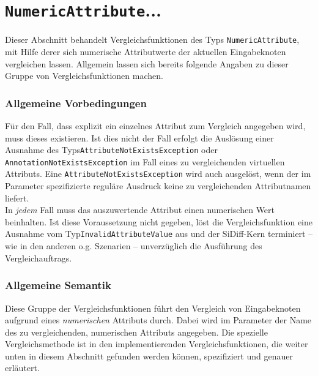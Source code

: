 %
%

\section{\texttt{NumericAttribute}...}
\label{strct:spec:numattr}
Dieser Abschnitt behandelt Vergleichsfunktionen des Typs \texttt{NumericAttribute}, mit Hilfe derer sich numerische Attributwerte der aktuellen Eingabeknoten vergleichen lassen. Allgemein lassen sich bereits folgende Angaben zu dieser Gruppe von Vergleichsfunktionen machen.

\subsubsection*{Allgemeine Vorbedingungen}
Für den Fall, dass explizit ein einzelnes Attribut zum Vergleich angegeben wird, muss dieses existieren. Ist dies nicht der Fall erfolgt die Auslösung einer Ausnahme des Typs\mylinebreak\texttt{AttributeNotExistsException} oder \texttt{AnnotationNotExistsException} im Fall eines zu vergleichenden virtuellen Attributs. Eine \texttt{AttributeNotExistsException} wird auch ausgelöst, wenn der im Parameter spezifizierte reguläre Ausdruck keine zu vergleichenden Attributnamen liefert.\\
In \emph{jedem} Fall muss das auszuwertende Attribut einen numerischen Wert beinhalten. Ist diese Voraussetzung nicht gegeben, löst die Vergleichsfunktion eine Ausnahme vom Typ\mylinebreak\texttt{InvalidAttributeValue} aus und der SiDiff-Kern terminiert -- wie in den anderen o.g. Szenarien -- unverzüglich die Ausführung des Vergleichauftrags.

\subsubsection*{Allgemeine Semantik}
Diese Gruppe der Vergleichsfunktionen führt den Vergleich von Eingabeknoten aufgrund eines \emph{numerischen} Attributs durch. Dabei wird im Parameter der Name des zu vergleichenden, numerischen Attributs angegeben. Die spezielle Vergleichsmethode ist in den implementierenden Vergleichsfunktionen, die weiter unten in diesem Abschnitt gefunden werden können, spezifiziert und genauer erläutert.

